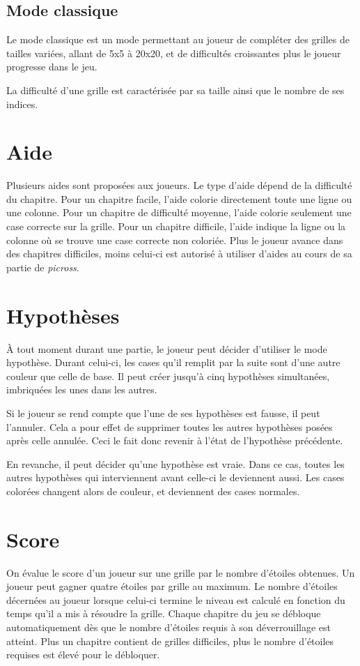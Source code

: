 \documentclass{report}
\begin{document}
		\subsection{Mode classique}
		    Le mode classique est un mode permettant au joueur de compléter des grilles de tailles variées, allant de 5x5 à 20x20, et de difficultés croissantes plus le joueur progresse dans le jeu.
		    
		    La difficulté d'une grille est caractérisée par sa taille ainsi que le nombre de ses indices.
			
		\section{Aide}
			Plusieurs aides sont proposées aux joueurs. Le type d'aide dépend de la difficulté du chapitre. Pour un chapitre facile, l'aide colorie directement toute une ligne ou une colonne. Pour un chapitre de difficulté moyenne, l'aide colorie seulement une case correcte sur la grille. Pour un chapitre difficile, l'aide indique la ligne ou la colonne où se trouve une case correcte non coloriée. Plus le joueur avance dans des chapitres difficiles, moins celui-ci est autorisé à utiliser d'aides au cours de sa partie de \textit{picross}. 

		\section{Hypothèses}			
			À tout moment durant une partie, le joueur peut décider d'utiliser le mode hypothèse. Durant celui-ci, les cases qu'il remplit par la suite sont d'une autre couleur que celle de base. Il peut créer jusqu'à cinq hypothèses simultanées, imbriquées les unes dans les autres.
			
			Si le joueur se rend compte que l'une de ses hypothèses est fausse, il peut l'annuler. Cela a pour effet de supprimer toutes les autres hypothèses posées après celle annulée. Ceci le fait donc revenir à l'état de l'hypothèse précédente.
			
			En revanche, il peut décider qu'une hypothèse est vraie. Dans ce cas, toutes les autres hypothèses qui interviennent avant celle-ci le deviennent aussi. Les cases colorées changent alors de couleur, et deviennent des cases normales.

		\section{Score}
			On évalue le score d'un joueur sur une grille par le nombre d'étoiles obtenues. Un joueur peut gagner quatre étoiles par grille au maximum. Le nombre d'étoiles décernées au joueur lorsque celui-ci termine le niveau est calculé en fonction du temps qu'il a mis à résoudre la grille. Chaque chapitre du jeu se débloque automatiquement dès que le nombre d'étoiles requis à son déverrouillage est atteint. Plus un chapitre contient de grilles difficiles, plus le nombre d'étoiles requises est élevé pour le débloquer.
			
\end{document}
